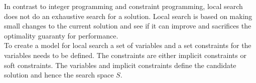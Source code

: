In contrast to integer programming and constraint programming, local search does not do an exhaustive 
search for a solution. Local search is based on making small changes to the current solution and 
see if it can improve and sacrifices the optimality guaranty for performance. \\ 
To create a model for local search a set of variables and a set constraints for the variables needs to be defined. The 
constraints are either implicit constraints or soft constraints. The variables and implicit constraints define the 
candidate solution and hence the search space $S$.
